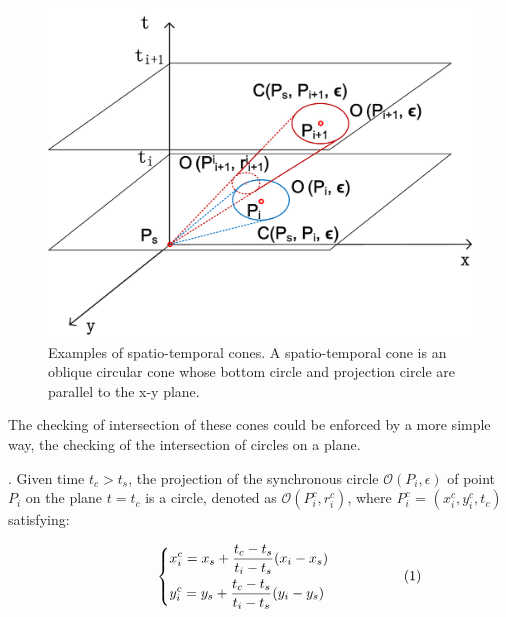 \begin{figure}[tb!]
\centering
\includegraphics[scale=0.6]{figures/Fig-cis.png}
\caption{\small Examples of spatio-temporal cones. A spatio-temporal cone is an oblique circular cone whose bottom circle and projection circle are parallel to the x-y plane. }
\vspace{-2ex}
\label{fig:cis}
\end{figure}

The checking of intersection of these cones could be enforced by a more simple way, \ie the checking of the intersection of circles on a plane.

. Given time $t_c > t_s$, the projection of the synchronous circle $\mathcal{O}(P_i, \epsilon)$ of point $P_i$ on the plane $t=t_c$ is a circle, denoted as $\mathcal{O}(P^c_i, r^c_i)$, where $P^c_i$ =  $(x^c_i, y^c_i, t_c)$ satisfying:


\vspace{-1ex}
\begin{equation*}
\label{equ-proj-circle-xy}
\hspace{10ex} \left\{
    \begin{aligned}
        & x^c_i = x_s +  \frac{t_c - t_s}{t_i - t_s}(x_i - x_s) \\
        & y^c_i = y_s +  \frac{t_c - t_s}{t_i - t_s}(y_i - y_s) \\
    \end{aligned}
    \right.       \hspace{12ex}(1)
\end{equation*}
\vspace{-1ex}

